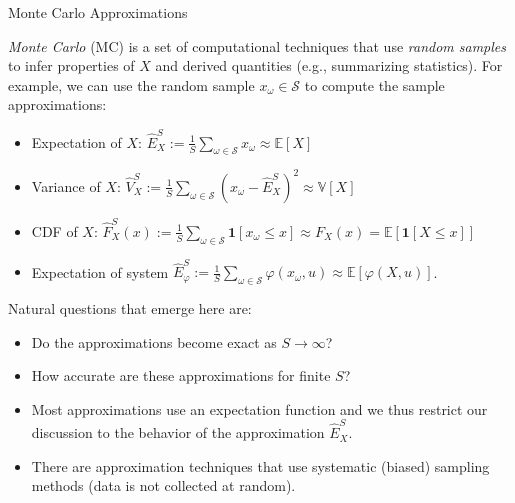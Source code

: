 \documentclass[9pt]{beamer}
\begin{document}
%
\begin{frame}{Monte Carlo Approximations}

{\em Monte Carlo} (MC) is a set of computational techniques that use {\em random samples} to infer properties of $X$ and derived quantities (e.g., summarizing statistics).  For example, we can use the random sample $x_\omega \in \mathcal{S}$ to compute the sample approximations:
\begin{block}{}
\begin{itemize}
\item Expectation of $X$: $\hat{E}_X^S:=\frac{1}{S}\sum_{\omega \in \mathcal{S}}x_\omega\approx \mathbb{E}[X]$
\item Variance of $X$: $\hat{V}_X^S:=\frac{1}{S}\sum_{\omega \in \mathcal{S}}(x_\omega-\hat{E}_X^S)^2\approx \mathbb{V}[X]$
\item CDF of $X$: $\hat{F}_X^S(x):=\frac{1}{S}\sum_{\omega 
\in \mathcal{S}}\mathbf{1}[x_\omega \leq x]\approx F_X(x)=\mathbb{E}[{\mathbf{1}[X \leq x]}]$
\item Expectation of system $\hat{E}_\varphi^S:=\frac{1}{S}\sum_{\omega 
\in \mathcal{S}}\varphi(x_\omega,u)\approx \mathbb{E}[{\varphi(X,u)}]$. 
\end{itemize}
\end{block}
Natural questions that emerge here are: 
\begin{block}{}
\begin{itemize}
\item Do the approximations become exact as $S\to \infty$?
\item How accurate are these approximations for finite $S$?
\end{itemize}
\end{block}
\begin{itemize}
\item Most approximations use an expectation function and we thus restrict our discussion to the behavior of the approximation $\hat{E}_X^S$. 
\item There are approximation techniques that use systematic (biased) sampling methods (data is not collected at random). 
\end{itemize}
\end{frame}
\end{document}
